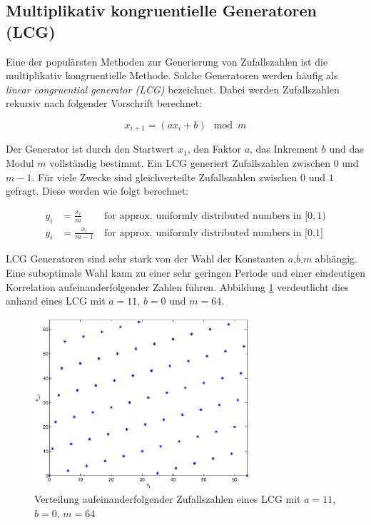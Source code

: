 \documentclass{book}
\begin{document}
\begin{refsection}
\newpage
\subsection{Multiplikativ kongruentielle Generatoren (LCG)} \label{subsec:LCG}
Eine der populärsten Methoden zur Generierung von Zufallszahlen ist die multiplikativ kongruentielle Methode. Solche Generatoren werden häufig als \textit{linear congruential generator (LCG)} bezeichnet. Dabei werden Zufallszahlen rekursiv nach folgender Vorschrift berechnet:

\begin{equation}
	x_{i+1} = \left( a x_{i} + b \right) \mod{m}
	\label{equ:lcg_equation}
\end{equation}

Der Generator ist durch den Startwert $x_1$, den Faktor $a$, das Inkrement $b$ und das Modul $m$ vollständig bestimmt. Ein LCG generiert Zufallszahlen zwischen $0$ und $m-1$. Für viele Zwecke sind gleichverteilte Zufallszahlen zwischen $0$ und $1$ gefragt. Diese werden wie folgt berechnet:

\begin{align}
	y_i &= \frac{x_i}{m} \: &\text{for approx. uniformly distributed numbers  in } [0,1)\\
	y_i &= \frac{x_i}{m-1} \: &\text{for approx. uniformly distributed numbers in [0,1]}
\end{align} 


LCG Generatoren sind sehr stark von der Wahl der Konstanten $a$,$b$,$m$ abhängig. Eine suboptimale Wahl kann zu einer sehr geringen Periode und einer eindeutigen Korrelation aufeinanderfolgender Zahlen führen. Abbildung \ref{fig:lcg_verteilung} verdeutlicht dies anhand eines LCG mit $a=11$, $b=0$ und $m=64$. \\

\begin{figure}[h]
	\centering
	\includegraphics[width=8cm]{images/lcg.eps}
	\caption{Verteilung aufeinanderfolgender Zufallszahlen eines LCG mit $a=11$, $b=0$, $m=64$}
	\label{fig:lcg_verteilung}
\end{figure}


\end{refsection}
\end{document}
